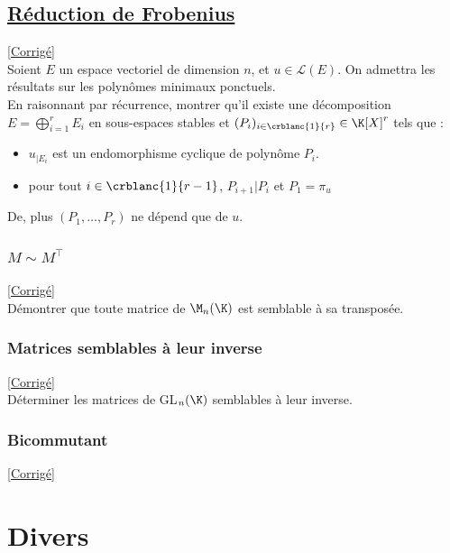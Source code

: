 \documentclass[8pt]{book}
\begin{document}
\section{\underline{Réduction de Frobenius}}
\label{Réduction de Frobenius}
\textcolor{blue}{\hyperref[Réduction de Frobenius corrigé]{[Corrigé]}}\\
Soient $E$ un espace vectoriel de dimension $n$, et $u\in\mathcal{L}(E)$.
On admettra les résultats sur les polynômes minimaux ponctuels. \\
En raisonnant par récurrence, montrer qu'il existe une décomposition $\displaystyle E=\bigoplus_{i=1}^rE_i$ en sous-espaces stables et $(P_i)_{i\in\crblanc{1}{r}}\in\K[X]^r$ tels que :
\begin{itemize}
	\item $u_{|E_i}$ est un endomorphisme cyclique de polynôme $P_i$.
	\item pour tout $i\in\crblanc{1}{r-1}$, $P_{i+1}|P_i$ et $P_1=\pi_u$
\end{itemize}
De, plus $(P_1,\dots,P_r)$ ne dépend que de $u$.

\subsection{$M\sim M^\top$}
\label{M est semblable à sa transposée}
\textcolor{blue}{\hyperref[M est semblable à sa transposée corrigé]{[Corrigé]}}\\
Démontrer que toute matrice de $\M_n(\K)$ est semblable à sa transposée.

\subsection{Matrices semblables à leur inverse}
\label{Matrices semblables à leur inverse}
\textcolor{blue}{\hyperref[Matrices semblables à leur inverse corrigé]{[Corrigé]}}\\
Déterminer les matrices de GL$_n(\K)$ semblables à leur inverse.

\subsection{Bicommutant}
\label{Bicommutant}
\textcolor{blue}{\hyperref[Bicommutant corrigé]{[Corrigé]}}\\

\chapter{Divers}
\end{document}
